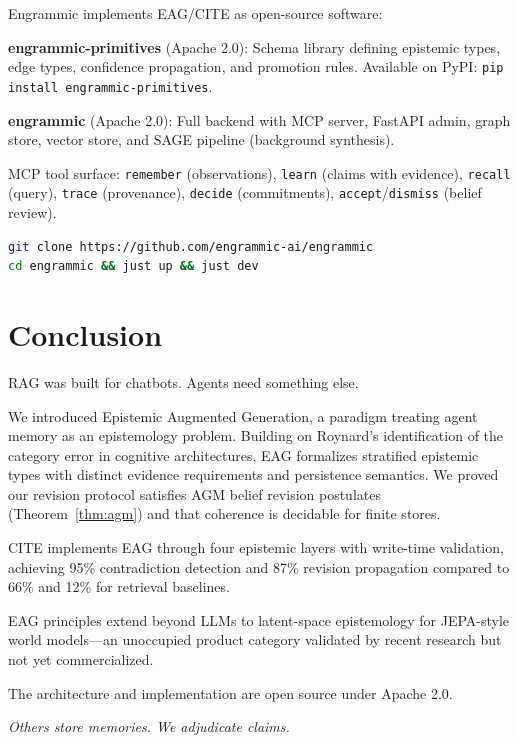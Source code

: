 \documentclass[11pt,a4paper]{article}
\begin{document}
Engrammic implements EAG/CITE as open-source software:

\textbf{engrammic-primitives} (Apache 2.0): Schema library defining epistemic types, edge types, confidence propagation, and promotion rules. Available on PyPI: \texttt{pip install engrammic-primitives}.

\textbf{engrammic} (Apache 2.0): Full backend with MCP server, FastAPI admin, graph store, vector store, and SAGE pipeline (background synthesis).

MCP tool surface: \texttt{remember} (observations), \texttt{learn} (claims with evidence), \texttt{recall} (query), \texttt{trace} (provenance), \texttt{decide} (commitments), \texttt{accept}/\texttt{dismiss} (belief review).

\begin{lstlisting}[language=bash]
git clone https://github.com/engrammic-ai/engrammic
cd engrammic && just up && just dev
\end{lstlisting}

\section{Conclusion}

RAG was built for chatbots. Agents need something else.

We introduced Epistemic Augmented Generation, a paradigm treating agent memory as an epistemology problem. Building on Roynard's identification of the category error in cognitive architectures, EAG formalizes stratified epistemic types with distinct evidence requirements and persistence semantics. We proved our revision protocol satisfies AGM belief revision postulates (Theorem~\ref{thm:agm}) and that coherence is decidable for finite stores.

CITE implements EAG through four epistemic layers with write-time validation, achieving 95\% contradiction detection and 87\% revision propagation compared to 66\% and 12\% for retrieval baselines.

EAG principles extend beyond LLMs to latent-space epistemology for JEPA-style world models---an unoccupied product category validated by recent research but not yet commercialized.

The architecture and implementation are open source under Apache 2.0.

\begin{center}
\textit{Others store memories. We adjudicate claims.}
\end{center}
\end{document}
